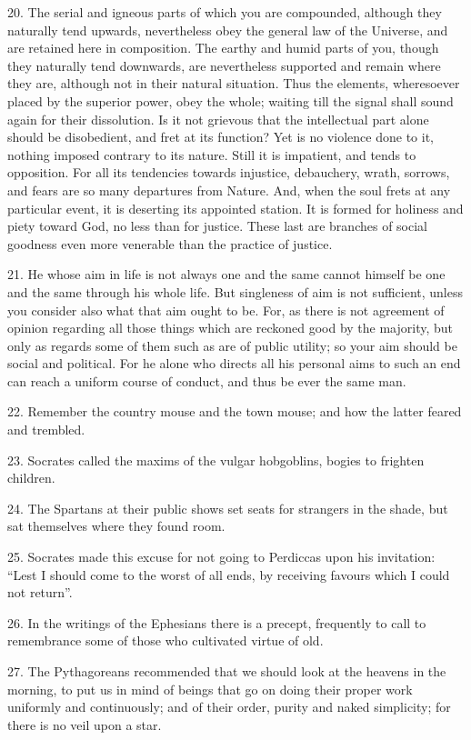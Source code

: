 \documentclass{book}
\begin{document}
20. The serial and igneous parts of which you are compounded, although
they naturally tend upwards, nevertheless obey the general law of the
Universe, and are retained here in composition. The earthy and humid
parts of you, though they naturally tend downwards, are nevertheless
supported and remain where they are, although not in their natural
situation. Thus the elements, wheresoever placed by the superior
power, obey the whole; waiting till the signal shall sound again for
their dissolution. Is it not grievous that the intellectual part alone
should be disobedient, and fret at its function? Yet is no violence
done to it, nothing imposed contrary to its nature. Still it is
impatient, and tends to opposition. For all its tendencies towards
injustice, debauchery, wrath, sorrows, and fears are so many
departures from Nature. And, when the soul frets at any particular
event, it is deserting its appointed station. It is formed for
holiness and piety toward God, no less than for justice. These last
are branches of social goodness even more venerable than the practice
of justice.

21. He whose aim in life is not always one and the same cannot himself
be one and the same through his whole life. But singleness of aim is
not sufficient, unless you consider also what that aim ought to
be. For, as there is not agreement of opinion regarding all those
things which are reckoned good by the majority, but only as regards
some of them such as are of public utility; so your aim should be
social and political. For he alone who directs all his personal aims
to such an end can reach a uniform course of conduct, and thus be ever
the same man.

22. Remember the country mouse and the town mouse; and how the latter
feared and trembled.

23. Socrates called the maxims of the vulgar hobgoblins, bogies to
frighten children.

24. The Spartans at their public shows set seats for strangers in the
shade, but sat themselves where they found room.

25. Socrates made this excuse for not going to Perdiccas upon his
invitation: ``Lest I should come to the worst of all ends, by receiving
favours which I could not return''.

26. In the writings of the Ephesians there is a precept, frequently to
call to remembrance some of those who cultivated virtue of old.

27. The Pythagoreans recommended that we should look at the heavens in
the morning, to put us in mind of beings that go on doing their proper
work uniformly and continuously; and of their order, purity and naked
simplicity; for there is no veil upon a star.
\end{document}
